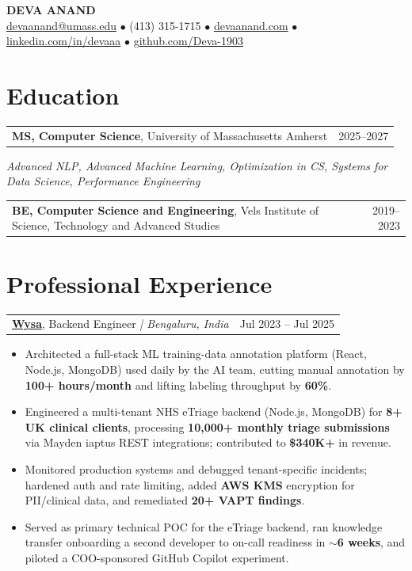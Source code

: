 \documentclass[letterpaper,11pt]{article}
\makeatletter
\newcommand{\eduItem}[3]{%
  \begin{tabular*}{\textwidth}{@{}l@{\extracolsep{\fill}}r@{}}
    \textbf{#1}, #2 & #3 \\
  \end{tabular*}\par
}
\newcommand{\expItem}[4]{%
  \vspace{3pt}
  \begin{tabular*}{\textwidth}{@{}l@{\extracolsep{\fill}}r@{}}
    \textbf{#1}, #2 \textit{| #3} & #4 \\
  \end{tabular*}\par\vspace{-2pt}
}
\makeatother
\begin{document}
\begin{center}
    {\fontsize{18}{20}\selectfont\bfseries DEVA ANAND}\\ \vspace{3pt}
    {\small
    \href{mailto:devaanand@umass.edu}{devaanand@umass.edu}
    \enspace$\bullet$\enspace
    (413) 315-1715
    \enspace$\bullet$\enspace
    \href{https://devaanand.com}{devaanand.com}
    \enspace$\bullet$\enspace
    \href{https://linkedin.com/in/devaaa/}{linkedin.com/in/devaaa}
    \enspace$\bullet$\enspace
    \href{https://github.com/Deva-1903}{github.com/Deva-1903}}
\end{center}
\vspace{-6pt}

\section{Education}
\eduItem{MS, Computer Science}{University of Massachusetts Amherst}{2025--2027}
{\small\textit{Advanced NLP, Advanced Machine Learning, Optimization in CS, Systems for Data Science, Performance Engineering}}\par
\vspace{3pt}
\eduItem{BE, Computer Science and Engineering}{Vels Institute of Science, Technology and Advanced Studies}{2019--2023}

\section{Professional Experience}

\expItem{\href{https://www.wysa.io}{Wysa}}{Backend Engineer}{Bengaluru, India}{Jul 2023 -- Jul 2025}
\begin{itemize}
  \item Architected a full-stack ML training-data annotation platform (React, Node.js, MongoDB) used daily by the AI team, cutting manual annotation by \textbf{100+ hours/month} and lifting labeling throughput by \textbf{60\%}.
  \item Engineered a multi-tenant NHS eTriage backend (Node.js, MongoDB) for \textbf{8+ UK clinical clients}, processing \textbf{10{,}000+ monthly triage submissions} via Mayden iaptus REST integrations; contributed to \textbf{\$340K+} in revenue.
  \item Monitored production systems and debugged tenant-specific incidents; hardened auth and rate limiting, added \textbf{AWS KMS} encryption for PII/clinical data, and remediated \textbf{20+ VAPT findings}.
  \item Served as primary technical POC for the eTriage backend, ran knowledge transfer onboarding a second developer to on-call readiness in \textbf{$\sim$6 weeks}, and piloted a COO-sponsored GitHub Copilot experiment.
\end{itemize}
\end{document}
